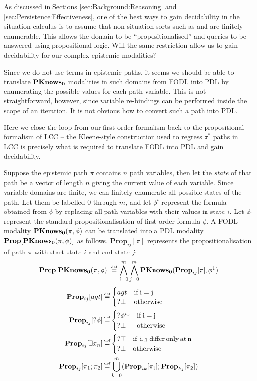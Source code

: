 As discussed in Sections \ref{sec:Background:Reasoning} and \ref{sec:Persistence:Effectiveness},
one of the best ways to gain decidability in the situation calculus
is to assume that non-situation sorts such as  and 
are finitely enumerable. This allows the domain to be {}``propositionalised''
and queries to be answered using propositional logic. Will the same
restriction allow us to gain decidability for our complex epistemic
modalities?

Since we do not use  terms in epistemic paths, it
seems we should be able to translate $\mathbf{PKnows_{0}}$ modalities in such
domains from FODL into PDL by enumerating the possible values for
each path variable. This is not straightforward, however, since variable
re-bindings can be performed inside the scope of an iteration. It
is not obvious how to convert such a path into PDL.

Here we close the loop from our first-order formalism back to the
propositional formalism of LCC -- the Kleene-style construction used
to regress $\pi^{*}$ paths in LCC is precisely what is required to
translate FODL into PDL and gain decidability.

Suppose the epistemic path $\pi$ contains $n$ path variables, then
let the \emph{state} of that path be a vector of length $n$ giving
the current value of each variable. Since variable domains are finite,
we can finitely enumerate all possible states of the path. Let them
be labelled $0$ through $m$, and let $\phi^{i}$ represent the formula
obtained from $\phi$ by replacing all path variables with their values
in state $i$. Let $\phi^{\downarrow}$ represent the standard propositionalisation
of first-order formula $\phi$. A FODL modality $\mathbf{PKnows_{0}}(\pi,\phi)$
can be translated into a PDL modality $\mathbf{Prop}[\mathbf{PKnows_{0}}(\pi,\phi)]$
as follows. $\mathbf{Prop}_{ij}[\pi]$ represents the propositionalisation
of path $\pi$ with start state $i$ and end state $j$:\[
\mathbf{Prop}[\mathbf{PKnows_{0}}(\pi,\phi)]\stackrel{\mbox{\tiny def}}{=}\bigwedge_{i=0}^{m}\bigwedge_{j=0}^{m}\mathbf{PKnows_{0}}(\mathbf{Prop}_{ij}[\pi],\phi^{\downarrow})\]
\begin{alignat*}{1}
\mathbf{Prop}_{ij}[agt]\stackrel{\mbox{\tiny def}}{=} & \begin{cases}
agt & \mathrm{if\, i=j}\\
?\bot & \mathrm{otherwise}\end{cases}\\
\mathbf{Prop}_{ij}[?\phi]\stackrel{\mbox{\tiny def}}{=} & \begin{cases}
?\phi^{i\downarrow} & \mathrm{if\, i=j}\\
?\bot & \mathrm{otherwise}\end{cases}\\
\mathbf{Prop}_{ij}[\exists x_{n}]\stackrel{\mbox{\tiny def}}{=} & \begin{cases}
?\top & \mathrm{if\,\, i,j\,\, differ\, only\, at\, n}\\
?\bot & \mathrm{otherwise}\end{cases}\\
\mathbf{Prop}_{ij}[\pi_{1};\pi_{2}]\stackrel{\mbox{\tiny def}}{=} & \bigcup_{k=0}^{m}(\mathbf{Prop}_{ik}[\pi_{1}];\mathbf{Prop}_{kj}[\pi_{2}])\end{alignat*}


